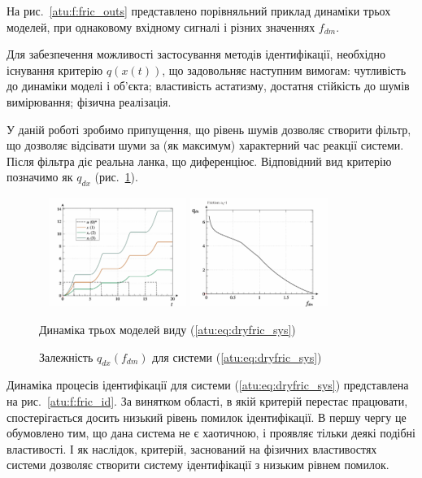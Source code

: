 \documentclass[a4paper,13pt]{atuaref}
\begin{document}
На рис.~\ref{atu:f:fric_outs}
представлено порівняльний приклад динаміки трьох моделей,
при однаковому вхідному сигналі і різних значеннях $ f_ {dm} $.

Для забезпечення можливості застосування методів ідентифікації, необхідно
існування критерію $ q (x (t)) $, що задовольняє наступним вимогам: чутливість
до динаміки моделі і об'єкта; властивість астатизму, достатня стійкість до
шумів вимірювання; фізична реалізація.

У даній роботі зробимо припущення, що рівень шумів дозволяє створити фільтр, що
дозволяє відсівати шуми за (як максимум) характерний час реакції системи. Після
фільтра діє реальна ланка, що диференціює. Відповідний вид критерію позначимо як
$ q_{dx} $ (рис.~\ref{atu:f:fric_q}).


\begin{figure}[htb!]
  {~} \hfill
  \includegraphics[width=0.40\textwidth]{p5/p/cha/fric/fric_outs1.png}
  \hfill
  \includegraphics[width=0.40\textwidth]{p5/p/cha/fric/fric_q-p_f_dm_q.png}
  \hfill {~}
  \\
  \parbox[t]{0.48\textwidth} {
    \caption{Динаміка трьох моделей виду (\ref{atu:eq:dryfric_sys})}
    \label{atu:f:fric_outs}
  } \hfill
  \parbox[t]{0.48\textwidth} {
    \caption{Залежність $q_{dx}(f_{dm})$ для системи (\ref{atu:eq:dryfric_sys}) }
    \label{atu:f:fric_q}
  }
\end{figure}

Динаміка процесів ідентифікації для системи (\ref{atu:eq:dryfric_sys})
представлена на рис.~\ref{atu:f:fric_id}.
За винятком області, в якій критерій перестає працювати,
спостерігається досить низький рівень помилок ідентифікації. В першу чергу це
обумовлено тим, що дана система не є хаотичною, і проявляє тільки деякі подібні
властивості. І як наслідок, критерій, заснований на фізичних властивостях
системи дозволяє створити систему ідентифікації з низьким рівнем помилок.
\end{document}
